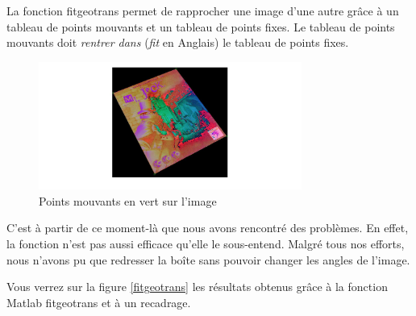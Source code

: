 \documentclass{st50_template}
\begin{document}
La fonction fitgeotrans permet de rapprocher une image d'une autre grâce à un tableau de points mouvants et un tableau de points fixes. Le tableau de points mouvants doit \emph{rentrer dans} (\emph{fit} en Anglais) le tableau de points fixes.

\begin{figure}[ht]
    \centering
    \includegraphics[width=0.77\textwidth]{images/movingPoints.jpg}
    \caption{Points mouvants en vert sur l'image}
    \label{movingPoints}
\end{figure}


C'est à partir de ce moment-là que nous avons rencontré des problèmes. En effet, la fonction n'est pas aussi efficace qu'elle le sous-entend. Malgré tous nos efforts, nous n'avons pu que redresser la boîte sans pouvoir changer les angles de l'image.

Vous verrez sur la figure \ref{fitgeotrans} les résultats obtenus grâce à la fonction Matlab fitgeotrans et à un recadrage.
\end{document}
